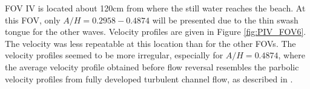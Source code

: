 \documentclass[a4paper, 11pt, english, twoside, openright]{article}
\begin{document}
 FOV IV is located about 120cm from where the still water reaches the beach. At this FOV, only $A/H=0.2958-0.4874$ will be presented due to the thin swash tongue for the other waves. Velocity profiles are given in Figure \ref{fig:PIV_FOV6}. The velocity was less repeatable at this location than for the other FOVs. The velocity profiles seemed to be more irregular, especially for $A/H=0.4874$, where the average velocity profile obtained before flow reversal resembles the parbolic velocity profiles from fully developed turbulent channel flow, as described in \cite{white2006viscous}. %
\end{document}
